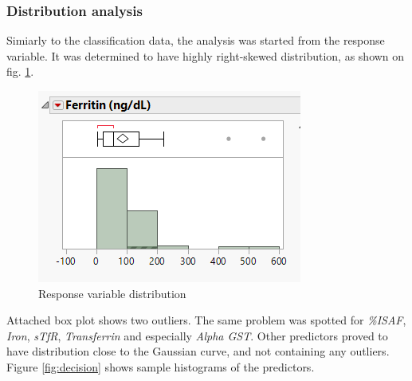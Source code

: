 	\subsubsection{Distribution analysis}
	
	Simiarly to the classification data, the analysis was started from the response variable. It was determined to have highly right-skewed distribution, as shown on fig. \ref{fig:ferritin}.
	
	\begin{figure}[!ht]
		\centering
		\includegraphics[width=0.5\linewidth]{Rozdzial3/ferritin}
		\caption{Response variable distribution}
		\label{fig:ferritin}
	\end{figure}
	
	Attached box plot shows two outliers. The same problem was spotted for \textit{\%ISAF}, \textit{Iron}, \textit{sTfR}, \textit{Transferrin} and especially \textit{Alpha GST}. Other predictors proved to have distribution close to the Gaussian curve, and not containing any outliers. Figure \ref{fig:decision} shows sample histograms of the predictors.
	
